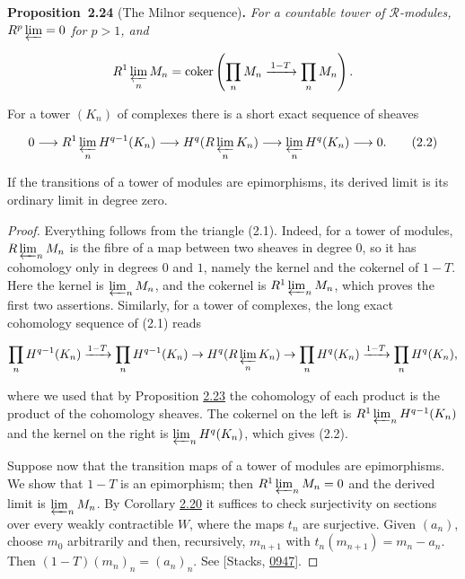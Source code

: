 \documentclass[11pt]{article}
\newenvironment{bpstatement}[2]{\par\addvspace{0.6\baselineskip}\noindent\textbf{#1}#2\textbf{.}\enspace\ignorespaces}
  {\par\addvspace{0.4\baselineskip}}
\newenvironment{bpstatementit}[2]{\begin{bpstatement}{#1}{#2}\itshape\ignorespaces}{\end{bpstatement}}
\providecommand{\coker}{}\renewcommand{\coker}{\operatorname{coker}}
\begin{document}
\label{bp71}%
\begin{bpstatementit}{Proposition~2.24}{ (The Milnor sequence)}
For a countable tower of \(\mathcal R\)-modules, \(R^p\varprojlim=0\) for \(p>1\), and

\[
R^1\varprojlim_n M_n
=\coker\left(\prod_n M_n\xrightarrow{\,1-T\,}\prod_n M_n\right).
\]

For a tower \((K_n)\) of complexes there is a short exact sequence of sheaves

\[
0\longrightarrow R^1\varprojlim_n H^{q-1}(K_n)
\longrightarrow H^q(R\varprojlim_nK_n)
\longrightarrow \varprojlim_n H^q(K_n)
\longrightarrow 0.
\tag{2.2}
\]

If the transitions of a tower of modules are epimorphisms, its derived limit is its ordinary limit in degree zero.
\end{bpstatementit}

\begin{proof}[{Proof}]\label{bp72}%
Everything follows from the triangle (2.1). Indeed, for a tower of modules, \(R\varprojlim_nM_n\) is the fibre of a map between two sheaves in degree \(0\), so it has cohomology only in degrees \(0\) and \(1\), namely the kernel and the cokernel of \(1-T\). Here the kernel is \(\varprojlim_nM_n\), and the cokernel is \(R^1\varprojlim_nM_n\), which proves the first two assertions. Similarly, for a tower of complexes, the long exact cohomology sequence of (2.1) reads

\[
\prod_nH^{q-1}(K_n)\xrightarrow{1-T}\prod_nH^{q-1}(K_n)
\to H^q(R\varprojlim_nK_n)\to\prod_nH^q(K_n)\xrightarrow{1-T}\prod_nH^q(K_n),
\]

where we used that by Proposition \hyperref[bp68]{2.23} the cohomology of each product is the product of the cohomology sheaves. The cokernel on the left is \(R^1\varprojlim_nH^{q-1}(K_n)\) and the kernel on the right is \(\varprojlim_nH^q(K_n)\), which gives (2.2).

Suppose now that the transition maps of a tower of modules are epimorphisms. We show that \(1-T\) is an epimorphism; then \(R^1\varprojlim_nM_n=0\) and the derived limit is \(\varprojlim_nM_n\). By Corollary \hyperref[bp59]{2.20} it suffices to check surjectivity on sections over every weakly contractible \(W\), where the maps \(t_n\) are surjective. Given \((a_n)\), choose \(m_0\) arbitrarily and then, recursively, \(m_{n+1}\) with \(t_n(m_{n+1})=m_n-a_n\). Then \((1-T)(m_n)_n=(a_n)_n\). See [Stacks, \href{https://stacks.math.columbia.edu/tag/0947}{0947}].
\end{proof}
\end{document}
